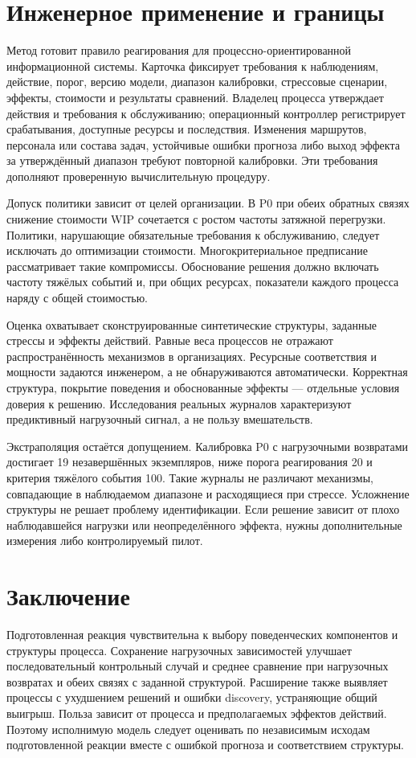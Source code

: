\section{Инженерное применение и границы}
Метод готовит правило реагирования для процессно-ориентированной информационной системы. Карточка фиксирует требования к наблюдениям, действие, порог, версию модели, диапазон калибровки, стрессовые сценарии, эффекты, стоимости и результаты сравнений. Владелец процесса утверждает действия и требования к обслуживанию; операционный контроллер регистрирует срабатывания, доступные ресурсы и последствия. Изменения маршрутов, персонала или состава задач, устойчивые ошибки прогноза либо выход эффекта за утверждённый диапазон требуют повторной калибровки. Эти требования дополняют проверенную вычислительную процедуру.

Допуск политики зависит от целей организации. В P0 при обеих обратных связях снижение стоимости WIP сочетается с ростом частоты затяжной перегрузки. Политики, нарушающие обязательные требования к обслуживанию, следует исключать до оптимизации стоимости. Многокритериальное предписание~\cite{multikpi} рассматривает такие компромиссы. Обоснование решения должно включать частоту тяжёлых событий и, при общих ресурсах, показатели каждого процесса наряду с общей стоимостью.

Оценка охватывает сконструированные синтетические структуры, заданные стрессы и эффекты действий. Равные веса процессов не отражают распространённость механизмов в организациях. Ресурсные соответствия и мощности задаются инженером, а не обнаруживаются автоматически. Корректная структура, покрытие поведения и обоснованные эффекты — отдельные условия доверия к решению. Исследования реальных журналов характеризуют предиктивный нагрузочный сигнал, а не пользу вмешательств.

Экстраполяция остаётся допущением. Калибровка P0 с нагрузочными возвратами достигает 19 незавершённых экземпляров, ниже порога реагирования 20 и критерия тяжёлого события 100. Такие журналы не различают механизмы, совпадающие в наблюдаемом диапазоне и расходящиеся при стрессе. Усложнение структуры не решает проблему идентификации. Если решение зависит от плохо наблюдавшейся нагрузки или неопределённого эффекта, нужны дополнительные измерения либо контролируемый пилот.

\section{Заключение}
Подготовленная реакция чувствительна к выбору поведенческих компонентов и структуры процесса. Сохранение нагрузочных зависимостей улучшает последовательный контрольный случай и среднее сравнение при нагрузочных возвратах и обеих связях с заданной структурой. Расширение также выявляет процессы с ухудшением решений и ошибки discovery, устраняющие общий выигрыш. Польза зависит от процесса и предполагаемых эффектов действий. Поэтому исполнимую модель следует оценивать по независимым исходам подготовленной реакции вместе с ошибкой прогноза и соответствием структуры.

